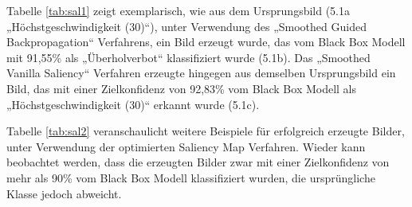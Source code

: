 Tabelle \ref{tab:sal1} zeigt exemplarisch, wie aus dem Ursprungsbild (5.1a „Höchstgeschwindigkeit (30)“), unter Verwendung des „Smoothed Guided Backpropagation“ Verfahrens, ein Bild erzeugt wurde, das vom Black Box Modell mit 91,55\% als „Überholverbot“ klassifiziert wurde (5.1b). 
Das „Smoothed Vanilla Saliency“ Verfahren erzeugte hingegen aus demselben Ursprungsbild ein Bild, das mit einer Zielkonfidenz von 92,83\% vom Black Box Modell als „Höchstgeschwindigkeit (30)“ erkannt wurde (5.1c).

Tabelle \ref{tab:sal2} veranschaulicht weitere Beispiele für erfolgreich erzeugte Bilder, unter Verwendung der optimierten Saliency Map Verfahren. Wieder kann beobachtet werden, dass die erzeugten Bilder zwar mit einer Zielkonfidenz von mehr als 90\% vom Black Box Modell klassifiziert wurden, die ursprüngliche Klasse jedoch abweicht.

